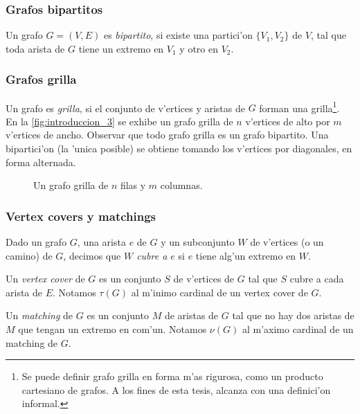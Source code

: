 \subsubsection*{Grafos bipartitos}

Un grafo $G = (V, E)$ es \textit{bipartito}, si existe una partici'on $\{V_1, V_2\}$ de $V$, tal que toda arista de $G$ tiene un extremo en $V_1$ y otro en $V_2$.

\subsubsection*{Grafos grilla}

Un grafo es \textit{grilla}, si el conjunto de v'ertices y aristas de $G$ forman una grilla\footnote{Se puede definir grafo grilla en forma m'as rigurosa, como un producto cartesiano de grafos. A los fines de esta tesis, alcanza con una definici'on informal.}. En la \autoref{fig:introduccion_3} se exhibe un grafo grilla de $n$ v'ertices de alto por $m$ v'ertices de ancho. Observar que todo grafo grilla es un grafo bipartito. Una bipartici'on (la 'unica posible) se obtiene tomando los v'ertices por diagonales, en forma alternada.

\begin{figure}[h]
\begin{center}

\caption{Un grafo grilla de $n$ filas y $m$ columnas.}
\label{fig:introduccion_3}
\end{center}
\end{figure}

\subsubsection*{Vertex covers y matchings}

Dado un grafo $G$, una arista $e$ de $G$ y un subconjunto $W$ de v'ertices (o un camino) de $G$, decimos que \textit{$W$ cubre a $e$} si $e$ tiene alg'un extremo en $W$.

Un \textit{vertex cover} de $G$ es un conjunto $S$ de v'ertices de $G$ tal que $S$ cubre a cada arista de $E$. Notamos $\tau(G)$ al m'inimo cardinal de un vertex cover de $G$.

Un \textit{matching} de $G$ es un conjunto $M$ de aristas de $G$ tal que no hay dos aristas de $M$ que tengan un extremo en com'un. Notamos $\nu(G)$ al m'aximo cardinal de un matching de $G$.

